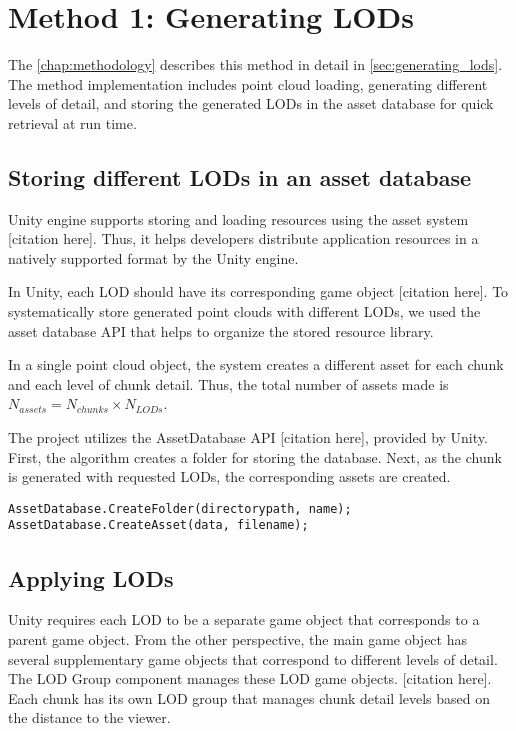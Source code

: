 \section{Method 1: Generating LODs}

The \autoref{chap:methodology} describes this method in detail in  \autoref{sec:generating_lods}. The method implementation includes point cloud loading, generating different levels of detail, and storing the generated LODs in the asset database for quick retrieval at run time.

\subsection{Storing different LODs in an asset database}

Unity engine supports storing and loading resources using the asset system [citation here]. Thus, it helps developers distribute application resources in a natively supported format by the Unity engine.

In Unity, each LOD should have its corresponding game object [citation here]. To systematically store generated point clouds with different LODs, we used the asset database API that helps to organize the stored resource library.

In a single point cloud object, the system creates a different asset for each chunk and each level of chunk detail. Thus, the total number of assets made is $N_{assets}=N_{chunks}\times N_{LODs}$.

The project utilizes the AssetDatabase API [citation here], provided by Unity. First, the algorithm creates a folder for storing the database. Next, as the chunk is generated with requested LODs, the corresponding assets are created.

\begin{lstlisting}[language={[Sharp]C}, caption=Asset database API usage example.]
AssetDatabase.CreateFolder(directorypath, name);
AssetDatabase.CreateAsset(data, filename);
\end{lstlisting}

\subsection{Applying LODs}

Unity requires each LOD to be a separate game object that corresponds to a parent game object. From the other perspective, the main game object has several supplementary game objects that correspond to different levels of detail. The LOD Group component manages these LOD game objects. [citation here]. Each chunk has its own LOD group that manages chunk detail levels based on the distance to the viewer.

